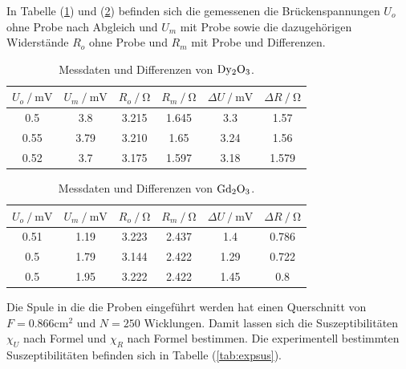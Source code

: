 \noindent
In Tabelle (\ref{tab:exp1}) und (\ref{tab:exp2}) befinden sich die gemessenen die Brückenspannungen $U_o$ ohne Probe nach Abgleich und $U_m$ mit Probe sowie die dazugehörigen Widerstände
$R_o$ ohne Probe und $R_m$ mit Probe und Differenzen. 

\begin{table}
    \centering
    \begin{tabular}{c c c c c c}
        \toprule
        {$U_o \mathbin{/} \si{\milli\volt}$} & {$U_m \mathbin{/} \si{\milli\volt}$} & {$R_o \mathbin{/} \si{\ohm}$} & {$R_m \mathbin{/} \si{\ohm}$} & {$\Delta U \mathbin{/} \si{\milli\volt}$} & {$\Delta R \mathbin{/} \si{\ohm}$} \\
    \midrule
    0.5     &   3.8   &     3.215     &     1.645    &   3.3   &  1.57  \\
    0.55    &   3.79  &     3.210     &     1.65     &   3.24  &  1.56  \\ 
    0.52    &   3.7   &     3.175     &     1.597    &   3.18  &  1.579 \\
    \bottomrule
\end{tabular}
\caption{Messdaten und Differenzen von $\ce{Dy2O3}$.}
\label{tab:exp1}
\end{table}

\begin{table}
    \centering
    \begin{tabular}{c c c c c c}
        \toprule
        {$U_o \mathbin{/} \si{\milli\volt}$} & {$U_m \mathbin{/} \si{\milli\volt}$} & {$R_o \mathbin{/} \si{\ohm}$} & {$R_m \mathbin{/} \si{\ohm}$} & {$\Delta U \mathbin{/} \si{\milli\volt}$} & {$\Delta R \mathbin{/} \si{\ohm}$} \\
    \midrule
    0.51    &   1.19   &     3.223     &     2.437    &   1.4   &  0.786  \\
    0.5     &   1.79   &     3.144     &     2.422    &   1.29  &  0.722  \\ 
    0.5     &   1.95   &     3.222     &     2.422    &   1.45  &  0.8    \\
    \bottomrule
\end{tabular}
\caption{Messdaten und Differenzen von $\ce{Gd2O3}$.}
\label{tab:exp2}
\end{table}

\noindent 
Die Spule in die die Proben eingeführt werden hat einen Querschnitt von $F=0.866\si{\centi\meter\squared}$ und $N=250$ Wicklungen.
Damit lassen sich die Suszeptibilitäten $\chi_U$ nach Formel %
und $\chi_R$ nach Formel %
bestimmen.
Die experimentell bestimmten Suszeptibilitäten befinden sich in Tabelle (\ref{tab:expsus}).

